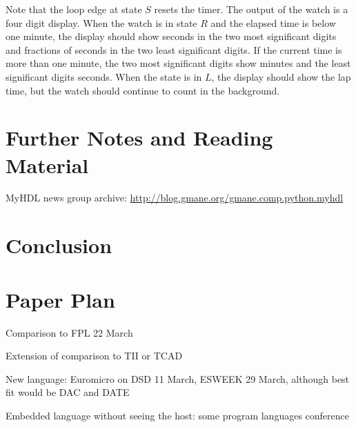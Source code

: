 \documentclass[10pt, technote, draftcls, onecolumn]{IEEEtran}
\newcommand{\comment}[3]{\paragraph*{\textbf{#1}}{\color{#3}#2}}
\newcommand{\martin}[1]{\comment{Martin}{#1}{Blue}}
\begin{document}

Note that the loop edge at state $S$ resets the timer. The output
of the watch is a four digit display. When the watch is in state
$R$ and the elapsed time is below one minute, the display should show
seconds in the two most significant digits and fractions of seconds in
the two least significant digits. If the current time is more than one
minute, the two most significant digits show minutes and the least
significant digits seconds. When the state is in $L$, the display
should show the lap time, but the watch should continue to count in
the background.


\section{Further Notes and Reading Material}

MyHDL news group archive: \url{http://blog.gmane.org/gmane.comp.python.myhdl}


% 



\section{Conclusion}
\label{sec:conclusion}






\section{Paper Plan}

Comparison to FPL 22 March

Extension of comparison to TII or TCAD

New language: Euromicro on DSD 11 March, ESWEEK 29 March, although best fit would be DAC and DATE

Embedded language without seeing the host: some program languages conference
\end{document}
